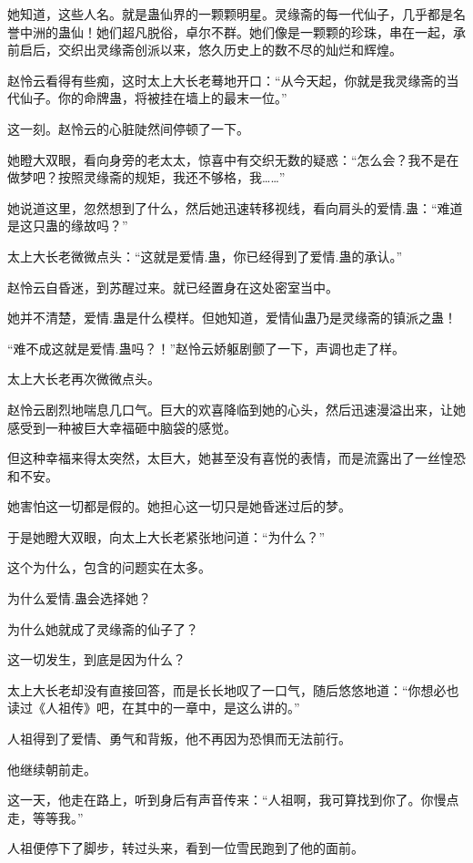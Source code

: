 \begin{this_body}
她知道，这些人名。就是蛊仙界的一颗颗明星。灵缘斋的每一代仙子，几乎都是名誉中洲的蛊仙！她们超凡脱俗，卓尔不群。她们像是一颗颗的珍珠，串在一起，承前启后，交织出灵缘斋创派以来，悠久历史上的数不尽的灿烂和辉煌。

赵怜云看得有些痴，这时太上大长老蓦地开口：“从今天起，你就是我灵缘斋的当代仙子。你的命牌蛊，将被挂在墙上的最末一位。”

这一刻。赵怜云的心脏陡然间停顿了一下。

她瞪大双眼，看向身旁的老太太，惊喜中有交织无数的疑惑：“怎么会？我不是在做梦吧？按照灵缘斋的规矩，我还不够格，我……”

她说道这里，忽然想到了什么，然后她迅速转移视线，看向肩头的爱情.蛊：“难道是这只蛊的缘故吗？”

太上大长老微微点头：“这就是爱情.蛊，你已经得到了爱情.蛊的承认。”

赵怜云自昏迷，到苏醒过来。就已经置身在这处密室当中。

她并不清楚，爱情.蛊是什么模样。但她知道，爱情仙蛊乃是灵缘斋的镇派之蛊！

“难不成这就是爱情.蛊吗？！”赵怜云娇躯剧颤了一下，声调也走了样。

太上大长老再次微微点头。

赵怜云剧烈地喘息几口气。巨大的欢喜降临到她的心头，然后迅速漫溢出来，让她感受到一种被巨大幸福砸中脑袋的感觉。

但这种幸福来得太突然，太巨大，她甚至没有喜悦的表情，而是流露出了一丝惶恐和不安。

她害怕这一切都是假的。她担心这一切只是她昏迷过后的梦。

于是她瞪大双眼，向太上大长老紧张地问道：“为什么？”

这个为什么，包含的问题实在太多。

为什么爱情.蛊会选择她？

为什么她就成了灵缘斋的仙子了？

这一切发生，到底是因为什么？

太上大长老却没有直接回答，而是长长地叹了一口气，随后悠悠地道：“你想必也读过《人祖传》吧，在其中的一章中，是这么讲的。”

人祖得到了爱情、勇气和背叛，他不再因为恐惧而无法前行。

他继续朝前走。

这一天，他走在路上，听到身后有声音传来：“人祖啊，我可算找到你了。你慢点走，等等我。”

人祖便停下了脚步，转过头来，看到一位雪民跑到了他的面前。


\end{this_body}

